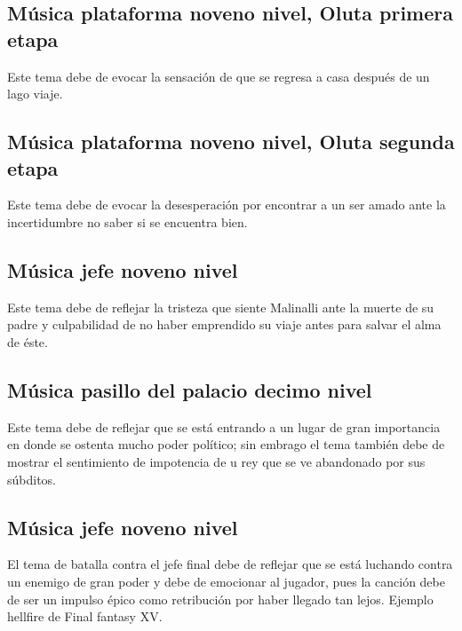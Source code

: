 \subsection{Música plataforma noveno nivel, Oluta primera etapa} \label{Musica:N09_ZN01C}
Este tema debe de evocar la sensación de que se regresa a casa después de un lago viaje.

\subsection{Música plataforma noveno nivel, Oluta segunda etapa} \label{Musica:N09_ZN01C02}
Este tema debe de evocar la desesperación por encontrar a un ser amado ante la incertidumbre no saber si se encuentra bien.

\subsection{Música jefe noveno nivel} \label{Musica:N09_ZN02}
Este tema debe de reflejar la tristeza que siente Malinalli ante la muerte de su padre y culpabilidad de no haber emprendido su viaje antes para salvar el alma de éste. 

\subsection{Música pasillo del palacio decimo nivel} \label{Musica:N10_ZN01}
Este tema debe de reflejar que se está entrando a un lugar de gran importancia en  donde se ostenta mucho poder político; sin embrago el tema también debe de mostrar el sentimiento de impotencia de u rey que se ve abandonado por sus súbditos. 

\subsection{Música jefe noveno nivel} \label{Musica:N10_ZN02}
El tema de batalla contra el jefe final debe de reflejar que se está luchando contra un enemigo de gran poder y debe de emocionar al jugador, pues la canción debe de ser un impulso épico como retribución por haber llegado tan lejos. Ejemplo hellfire de Final fantasy XV. 